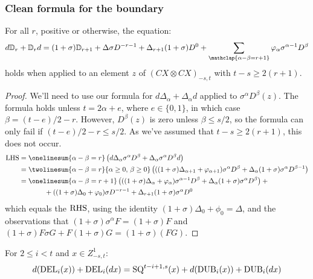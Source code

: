 \documentclass[10pt]{article}
\newcommand{\twist}{\sigma}
\begin{document}
\begin{letter to Dwyer}
\subsubsection*{Clean formula for the boundary}
\begin{lem}\label{boundaryVsBBD}
For all $r$, positive or otherwise, the equation:
\[d\mathbb{D}_r+\mathbb{D}_rd=(1+\twist)\mathbb{D}_{r+1}+\Delta\sigma D^{-r-1}+\Delta_{r+1}(1+\twist)D^0+\sum_{\mathclap{\alpha-\beta=r+1}} \phi_{\alpha}\sigma^{\alpha-1}D^{\beta}\]
holds when applied to an element $z$ of $(CX\otimes CX)_{-s,t}$ with $t-s\geq 2(r+1)$.
\end{lem}
\begin{proof}We'll need to use our formula for $d\Delta_\alpha+\Delta_\alpha d$ applied to $\twist^\alpha D^\beta(z)$. %
The formula holds unless $t=2\alpha+e$, where $e\in\{0,1\}$, in which case $\beta=(t-e)/2-r$. However, $D^\beta(z)$ is zero unless $\beta\leq s/2$, so the formula can only fail if $(t-e)/2-r\leq s/2$. As we've assumed that $t-s\geq2(r+1)$, this does not occur.
%
\begin{alignat*}{2}
\textup{LHS}
&=
\onelinesum{\alpha-\beta=r}\left(d\Delta_\alpha\twist^\alpha D^\beta+\Delta_\alpha\twist^\alpha D^\beta d\right)%
\\
&=
\twolinesum{\alpha-\beta=r}{\alpha\geq0,\,\beta\geq0}\left(((1+\twist)\Delta_{\alpha+1}+\phi_{\alpha+1})\twist^\alpha D^\beta+\Delta_\alpha(1+\twist)\twist^\alpha D^{\beta-1}\right)%
\\
&=
\onelinesum{\alpha-\beta=r+1}\left(((1+\twist)\Delta_{\alpha}+ \phi_{\alpha})\twist^{\alpha-1} D^\beta+\Delta_\alpha(1+\twist)\twist^\alpha D^{\beta}\right) + {}%
\\
&\ \ \ \ \ \ \ \ \ \ \ +
((1+\twist)\Delta_{0}+\phi_{0})\twist D^{-r-1}+\Delta_{r+1}(1+\twist)\twist^\alpha D^{0}%
\end{alignat*}
which equals the $\textup{RHS}$, using the identity $(1+\twist)\Delta_{0}+\phi_{0}=\Delta$, and the observations that $(1+\twist)\twist^\alpha F=(1+\twist)F$ and $(1+\twist)F\twist G+F(1+\twist)G=(1+\twist)(FG)$.
\end{proof}
\begin{cor}
For $2\leq i<t$ and $x\in Z^1_{-s,t}$:
\[d(\textup{DEL}_i(x))+ \textup{DEL}_i(dx)=\textup{SQ}^{t-i+1,s}(x)+d(\textup{DUB}_i(x))+\textup{DUB}_i(dx)\]

\end{cor}
\end{letter to Dwyer}
\end{document}
